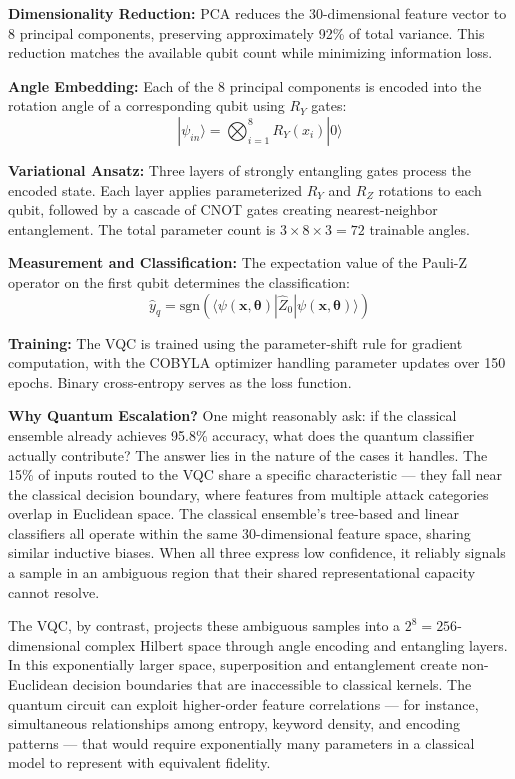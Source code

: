 \documentclass[journal,onecolumn]{IEEEtran}
\begin{document}
\textbf{Dimensionality Reduction:} PCA reduces the 30-dimensional feature vector to 8 principal components, preserving approximately 92\% of total variance. This reduction matches the available qubit count while minimizing information loss.

\textbf{Angle Embedding:} Each of the 8 principal components is encoded into the rotation angle of a corresponding qubit using $R_Y$ gates:
\begin{equation}
|\psi_{in}\rangle = \bigotimes_{i=1}^{8} R_Y(x_i)|0\rangle
\end{equation}

\textbf{Variational Ansatz:} Three layers of strongly entangling gates process the encoded state. Each layer applies parameterized $R_Y$ and $R_Z$ rotations to each qubit, followed by a cascade of CNOT gates creating nearest-neighbor entanglement. The total parameter count is $3 \times 8 \times 3 = 72$ trainable angles.

\textbf{Measurement and Classification:} The expectation value of the Pauli-Z operator on the first qubit determines the classification:
\begin{equation}
\hat{y}_q = \text{sgn}\left(\langle\psi(\mathbf{x}, \boldsymbol{\theta})|\hat{Z}_0|\psi(\mathbf{x}, \boldsymbol{\theta})\rangle\right)
\end{equation}

\textbf{Training:} The VQC is trained using the parameter-shift rule for gradient computation, with the COBYLA optimizer handling parameter updates over 150 epochs. Binary cross-entropy serves as the loss function.

\textbf{Why Quantum Escalation?} One might reasonably ask: if the classical ensemble already achieves 95.8\% accuracy, what does the quantum classifier actually contribute? The answer lies in the nature of the cases it handles. The 15\% of inputs routed to the VQC share a specific characteristic --- they fall near the classical decision boundary, where features from multiple attack categories overlap in Euclidean space. The classical ensemble's tree-based and linear classifiers all operate within the same 30-dimensional feature space, sharing similar inductive biases. When all three express low confidence, it reliably signals a sample in an ambiguous region that their shared representational capacity cannot resolve.

The VQC, by contrast, projects these ambiguous samples into a $2^{8} = 256$-dimensional complex Hilbert space through angle encoding and entangling layers. In this exponentially larger space, superposition and entanglement create non-Euclidean decision boundaries that are inaccessible to classical kernels. The quantum circuit can exploit higher-order feature correlations --- for instance, simultaneous relationships among entropy, keyword density, and encoding patterns --- that would require exponentially many parameters in a classical model to represent with equivalent fidelity.
\end{document}
